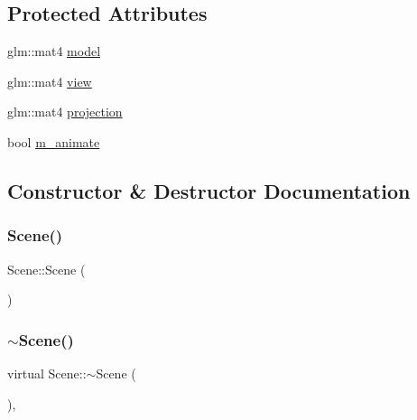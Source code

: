 \subsection*{Protected Attributes}
\begin{DoxyCompactItemize}
\item 
glm\+::mat4 \mbox{\hyperlink{class_scene_adb9af7d1ae176f7dd37ae98dd8c17f33}{model}}
\item 
glm\+::mat4 \mbox{\hyperlink{class_scene_a0f02dd92fafa0ad6e820afb9214393c2}{view}}
\item 
glm\+::mat4 \mbox{\hyperlink{class_scene_a866fbd2d4a47a2e78675f8c16da96b6e}{projection}}
\item 
bool \mbox{\hyperlink{class_scene_ac9faebc03e9de1f056c399cd57142044}{m\+\_\+animate}}
\end{DoxyCompactItemize}


\subsection{Constructor \& Destructor Documentation}
\mbox{\label{class_scene_ad10176d75a9cc0da56626f682d083507}} 
\subsubsection{\texorpdfstring{Scene()}{Scene()}}
{\footnotesize\ttfamily Scene\+::\+Scene (\begin{DoxyParamCaption}{ }\end{DoxyParamCaption})\hspace{0.3cm}{\ttfamily [inline]}}

\mbox{\label{class_scene_aa0a5be58e2ee2d1fdafc5fb46b5e661e}} 
\subsubsection{\texorpdfstring{$\sim$Scene()}{~Scene()}}
{\footnotesize\ttfamily virtual Scene\+::$\sim$\+Scene (\begin{DoxyParamCaption}{ }\end{DoxyParamCaption})\hspace{0.3cm}{\ttfamily [inline]}, {\ttfamily [virtual]}}



